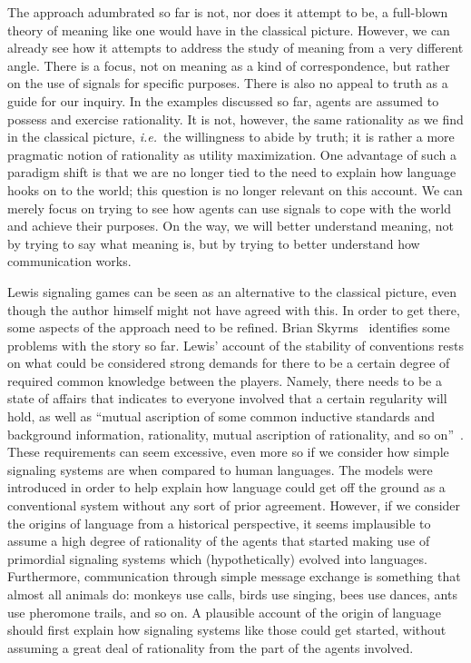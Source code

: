 \documentclass[a4paper]{article}
\begin{document}
The approach adumbrated so far is not, nor does it attempt to be, a full-blown theory of meaning like one would have in the classical picture.
However, we can already see how it attempts to address the study of meaning from a very different angle.
There is a focus, not on meaning as a kind of correspondence, but rather on the use of signals for specific purposes.
There is also no appeal to truth as a guide for our inquiry.
In the examples discussed so far, agents are assumed to possess and exercise rationality.
It is not, however, the same rationality as we find in the classical picture, \emph{i.e.}~the willingness to abide by truth; it is rather a more pragmatic notion of rationality as utility maximization.
One advantage of such a paradigm shift is that we are no longer tied to the need to explain how language hooks on to the world; this question is no longer relevant on this account.
We can merely focus on trying to see how agents can use signals to cope with the world and achieve their purposes.
On the way, we will better understand meaning, not by trying to say what meaning is, but by trying to better understand how communication works.

Lewis signaling games can be seen as an alternative to the classical picture, even though the author himself might not have agreed with this.
In order to get there, some aspects of the approach need to be refined.
Brian Skyrms~\parencite*[80--104]{skyrms_evolution_1996} identifies some problems with the story so far.
Lewis' account of the stability of conventions rests on what could be considered strong demands for there to be a certain degree of required common knowledge between the players.
Namely, there needs to be a state of affairs that indicates to everyone involved that a certain regularity will hold, as well as ``mutual ascription of some common inductive standards and background information, rationality, mutual ascription of rationality, and so on''~\parencite*[56--57]{lewis_convention_1969}.
These requirements can seem excessive, even more so if we consider how simple signaling systems are when compared to human languages.
The models were introduced in order to help explain how language could get off the ground as a conventional system without any sort of prior agreement.
However, if we consider the origins of language from a historical perspective, it seems implausible to assume a high degree of rationality of the agents that started making use of primordial signaling systems which (hypothetically) evolved into languages.
Furthermore, communication through simple message exchange is something that almost all animals do: monkeys use calls, birds use singing, bees use dances, ants use pheromone trails, and so on.
A plausible account of the origin of language should first explain how signaling systems like those could get started, without assuming a great deal of rationality from the part of the agents involved.
\end{document}
